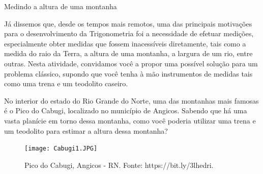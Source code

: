 
\begin{task}{Medindo a altura de uma montanha}

Já dissemos que, desde os tempos mais remotos, uma das principais motivações para o desenvolvimento da Trigonometria foi a necessidade de efetuar medições, especialmente obter medidas que fossem inacessíveis diretamente, tais como a medida do raio da Terra, a altura de uma montanha, a largura de um rio, entre outras. Nesta atividade, convidamos você a propor uma possível solução para um problema clássico, supondo que você tenha à mão instrumentos de medidas tais como uma trena e um teodolito caseiro.

No interior do estado do Rio Grande do Norte, uma das montanhas mais famosas é o Pico do Cabugi, localizado no município de Angicos. Sabendo que há uma vasta planície em torno dessa montanha, como você poderia utilizar uma trena e um teodolito para estimar a altura dessa montanha? 

\begin{figure}[H]
    \centering
    \texttt{[image: Cabugi1.JPG]}
    \caption{Pico do Cabugi,  Angicos - RN. Fonte: https://bit.ly/3lhedri.}
    \label{Cabugi1}
\end{figure}
\end{task}

